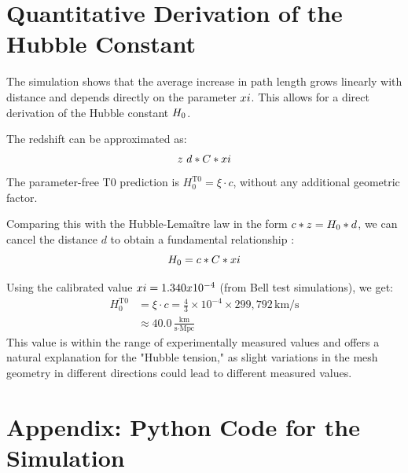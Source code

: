 \documentclass[12pt,a4paper]{report}
\begin{document}
	\section{Quantitative Derivation of the Hubble Constant}
	
	The simulation shows that the average increase in path length grows linearly with distance and depends directly on the parameter $xi$. This allows for a direct derivation of the Hubble constant $H_0$.
	
	The redshift can be approximated as:
	\begin{equation}
		z ~ d * C * xi
	\end{equation}
	The parameter-free T0 prediction is $H_0^{\text{T0}} = \xi \cdot c$, without any additional geometric factor.
	
	Comparing this with the Hubble-Lemaître law in the form $c * z = H_0 * d$, we can cancel the distance $d$ to obtain a fundamental relationship \cite{pascher:geometric_formalism}:
	\begin{equation}
		H_0 = c * C * xi
	\end{equation}
	
	Using the calibrated value $xi = 1.340 x 10^{-4}$ (from Bell test simulations), we get:
	\begin{align*}
		H_0^{\text{T0}} &= \xi \cdot c = \frac{4}{3} \times 10^{-4} \times 299{,}792\,\text{km/s} \\
		&\approx 40.0 \, \frac{\text{km}}{\text{s} \cdot \text{Mpc}}
	\end{align*}
	This value is within the range of experimentally measured values \cite{riess2019} and offers a natural explanation for the "Hubble tension," as slight variations in the mesh geometry in different directions could lead to different measured values.
	
	\section*{Appendix: Python Code for the Simulation}
	
\end{document}
